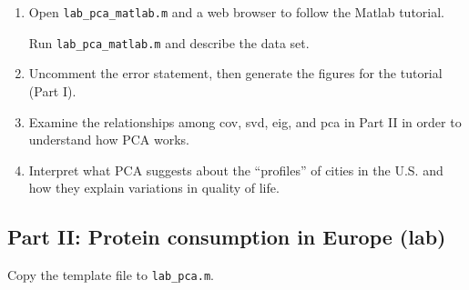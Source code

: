 \documentclass[11pt,titlepage,fleqn]{article}
\begin{document}
\begin{enumerate}
\item Open \verb+lab_pca_matlab.m+ and a web browser to follow the Matlab tutorial.

Run \verb+lab_pca_matlab.m+ and describe the data set.

\vertgap
\vertgap
\vertgap

\item Uncomment the error statement, then generate the figures for the tutorial (Part I).

\item Examine the relationships among cov, svd, eig, and pca in Part II in order to understand how PCA works.

\vertgap
\vertgap

\item Interpret what PCA suggests about the ``profiles'' of cities in the U.S. and how they explain variations in quality of life.

\vertgap
\vertgap
\vertgap



\end{enumerate}


\pagebreak
\subsection*{Part II: Protein consumption in Europe (lab)}

Copy the template file to \verb+lab_pca.m+.
\end{document}
